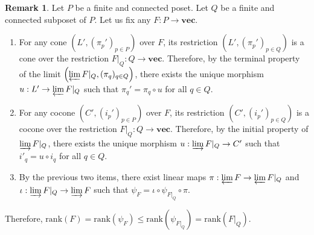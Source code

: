 \documentclass[11pt]{article}
\theoremstyle{definition}
\newtheorem{remark}[theorem]{Remark}
\newcommand{\rank}{\mathrm{rank}}
\newcommand{\Pb}{P}
\newcommand{\Q}{Q}
\newcommand{\vect}{\mathbf{vec}}
\begin{document}
\begin{remark}\label{rem:canonical projection}Let $\Pb$ be a finite and connected poset. Let $\Q$ be a finite and connected subposet of $\Pb$. Let us fix any $F:\Pb \rightarrow \vect$.
\begin{enumerate}[label=(\roman*)]
    \item  For any cone $\left(L', (\pi_p')_{p\in \Pb}\right)$ over $F$, its restriction $\left(L', (\pi_p')_{p\in \Q}\right)$ is a cone over the restriction $F|_\Q:\Q\rightarrow \vect$. Therefore, by the terminal property of the limit  $\left(\varprojlim F|_{\Q}, (\pi_q)_{q\in \Q}\right)$, there exists the unique morphism $u:L' \rightarrow \varprojlim F|_{\Q}$ such that  $\pi_q'=\pi_q\circ u$ for all $q\in \Q$.\label{item:canonical projection 1}
    \item  For any cocone $\left(C', (i_p')_{p\in \Pb}\right)$ over $F$, its restriction $\left(C', (i_p')_{p\in \Q}\right)$ is a cocone over the restriction $F|_\Q:\Q\rightarrow \vect$. Therefore, by the initial property of $\varinjlim F|_{\Q}$, there exists the unique morphism $u:\varinjlim F|_{\Q} \rightarrow C'$ such that $i'_q=u\circ i_q$ for all $q\in \Q$.\label{item:canonical projection 2}
     \item By the previous two items, there exist linear maps $\pi:\varprojlim F\rightarrow \varprojlim F|_{\Q}$ and $\iota:\varinjlim F|_{\Q}\rightarrow \varinjlim F$ such that
     $\psi_F=\iota \circ \psi_{F|_{\Q}} \circ \pi.$\label{item:canonical projection 3}
\end{enumerate}
Therefore, $\rank(F)=\rank(\psi_{F})\leq \rank (\psi_{F|_{\Q}})=\rank(F|_{\Q})$.
\end{remark}




 
\end{document}
